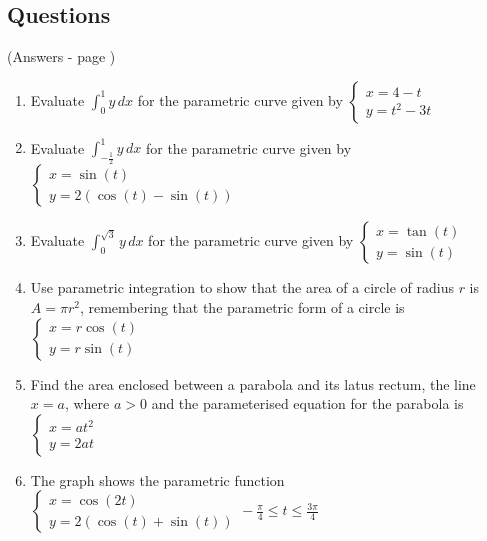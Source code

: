 \documentclass[../main.tex]{subfiles}
\begin{document}
\pagebreak

\subsection*{Questions}
(Answers - page \pageref*{Parametric integration answers})
\label{parametric integration}
\begin{enumerate}[itemsep=1cm]
    \item 
    Evaluate $\int_0^1 y\,dx$ for the parametric curve given by $\begin{cases} x=4-t \\ y=t^2-3t \end{cases}$

    \item 
    Evaluate $\int_{-\frac{1}{2}}^1 y\,dx$ for the parametric curve given by $\begin{cases} x=\sin{(t)} \\ y=2(\cos{(t)}-\sin{(t)}) \end{cases}$

    \item 
    Evaluate $\int_0^{\sqrt{3}}y\,dx$ for the parametric curve given by $\begin{cases} x=\tan{(t)} \\ y=\sin{(t)} \end{cases}$

    \item 
    Use parametric integration to show that the area of a circle of radius $r$ is $A=\pi r^2$, remembering that the parametric form of a circle is $\begin{cases} x=r\cos{(t)} \\ y=r\sin{(t)} \end{cases}$

    \item 
    Find the area enclosed between a parabola and its latus rectum, the line $x=a$, where $a>0$ and the parameterised equation for the parabola is $\begin{cases} x=at^2 \\ y=2at \end{cases}$

    \item 
    The graph shows the parametric function $\begin{cases} x=\cos{(2t)} \\ y=2(\cos{(t)}+\sin{(t)}) \end{cases} -\frac{\pi}{4}\leq t \leq \frac{3\pi}{4}$


\end{enumerate}
\end{document}
